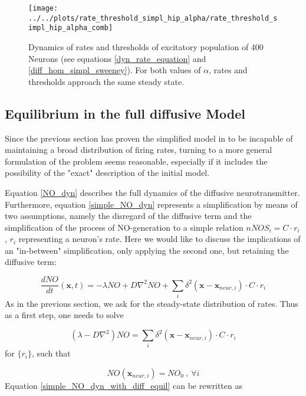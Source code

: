 \documentclass[10pt,a4paper]{article}
\begin{document}
\begin{figure}
\texttt{[image: ../../plots/rate\_threshold\_simpl\_hip\_alpha/rate\_threshold\_simpl\_hip\_alpha\_comb]}
\caption{Dynamics of rates and thresholds of excitatory population of 400 Neurons (see equations \eqref{dyn_rate_equation} and \eqref{diff_hom_simpl_sweeney}). For both values of $\alpha$, rates and thresholds approach the same steady state.}
\label{dynamics_rate_threshold_dyn_mean_field_sweeney}
\end{figure}

\subsection{Equilibrium in the full diffusive Model}

Since the previous section has proven the simplified model in \cite{Sweeney_Paper} to be incapable of maintaining a broad distribution of firing rates, turning to a more general formulation of the problem seems reasonable, especially if it includes the possibility of the "exact" description of the initial model.

Equation \eqref{NO_dyn} describes the full dynamics of the diffusive neurotransmitter. Furthermore, equation \eqref{simple_NO_dyn} represents a simplification by means of two assumptions, namely the disregard of the diffusive term and the simplification of the process of NO-generation to a simple relation $nNOS_i = C \cdot r_i$, $r_i$ representing a neuron's rate. Here we would like to discuss the implications of an "in-between" simplification, only applying the second one, but retaining the diffusive term:

\begin{equation}
\frac{dNO}{dt}(\mathbf{x},t) =-\lambda NO + D \nabla^2 NO + \sum_{i} \delta^2(\mathbf{x}-\mathbf{x}_{neur,i})\cdot C \cdot r_i
\label{simple_NO_dyn_with_diff}
\end{equation}
As in the previous section, we ask for the steady-state distribution of rates. Thus as a first step, one needs to solve

\begin{equation}
(\lambda - D \nabla^2) NO = \sum_{i} \delta^2(\mathbf{x}-\mathbf{x}_{neur,i})\cdot C \cdot r_i
\label{simple_NO_dyn_with_diff_equil}
\end{equation}
for $\lbrace r_i\rbrace$, such that

\begin{equation}
NO(\mathbf{x}_{neur,i}) = NO_0 \:, \: \forall i
\label{NO_equil_cond}
\end{equation}
Equation \eqref{simple_NO_dyn_with_diff_equil} can be rewritten as
\end{document}
